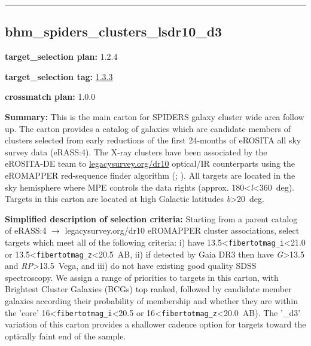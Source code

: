 \begin{center}\rule{0.5\linewidth}{0.5pt}\end{center}

\hypertarget{bhm_spiders_clusters_lsdr10_d3_plan1.2.4}{%
\subsection{bhm\_spiders\_clusters\_lsdr10\_d3}\label{bhm_spiders_clusters_lsdr10_d3_plan1.2.4}}

\noindent\textbf{target\_selection plan:} 1.2.4

\noindent\textbf{target\_selection tag:}
\href{https://github.com/sdss/target_selection/tree/1.3.3/}{1.3.3}

\noindent\textbf{crossmatch plan:} 1.0.0

\noindent\textbf{Summary:} This is the main carton for SPIDERS galaxy cluster
wide area follow up. The carton provides a catalog of galaxies which are
candidate members of clusters selected from early reductions of the
first 24-months of eROSITA all sky survey data (eRASS:4). The X-ray
clusters have been associated by the eROSITA-DE team to
\href{https://www.legacysurvey.org/dr10/}{legacysurvey.org/dr10}
optical/IR counterparts using the eROMAPPER red-sequence finder
algorithm
(\citealt{Rykoff2014};
\citealt{IderChitham2020}). All targets are located in the sky hemisphere
where MPE controls the data rights (approx.
180\textless{}\emph{l}\textless360~deg). Targets in this carton are
located at high Galactic latitudes
\textbar{}\emph{b}\textbar\textgreater20~deg.

\noindent\textbf{Simplified description of selection criteria:} Starting from a
parent catalog of eRASS:4 $\rightarrow$ legacysurvey.org/dr10 eROMAPPER cluster
associations, select targets which meet all of the following criteria:
i) have 13.5\textless{}\texttt{fibertotmag\_i}\textless21.0 or
13.5\textless{}\texttt{fibertotmag\_z}\textless20.5~AB, ii) if detected
by Gaia DR3 then have \emph{G}\textgreater13.5 and
\emph{RP}\textgreater13.5~Vega, and iii) do not have existing good
quality SDSS spectroscopy. We assign a range of priorities to targets in
this carton, with Brightest Cluster Galaxies (BCGs) top ranked, followed
by candidate member galaxies according their probability of membership
and whether they are within the 'core'
16\textless{}\texttt{fibertotmag\_i}\textless20.5 or
16\textless{}\texttt{fibertotmag\_z}\textless20.0~AB). The '\_d3'
variation of this carton provides a shallower cadence option for targets
toward the optically faint end of the sample.


